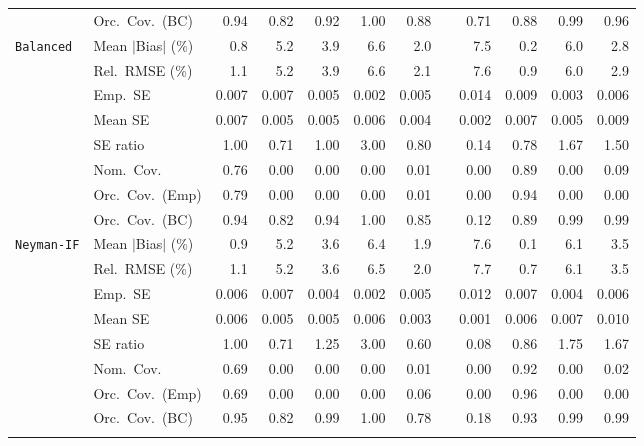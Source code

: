 \begin{landscape}
\begin{longtable}{llrrrrrrrrrr}
 & Orc.\ Cov.\ (BC) & \cellcolor{rankone}0.94 & 0.82 & \cellcolor{ranktwo}0.92 & 1.00 & 0.88 &  & 0.71 & 0.88 & \cellcolor{rankthree}0.99 & \cellcolor{rankone}0.96 \\
\addlinespace[2pt]
\quad \texttt{Balanced} & Mean $|$Bias$|$ (\%) & \cellcolor{ranktwo}0.8 & 5.2 & 3.9 & 6.6 & \cellcolor{rankthree}2.0 &  & 7.5 & \cellcolor{rankone}0.2 & 6.0 & 2.8 \\
 & Rel.\ RMSE (\%) & \cellcolor{ranktwo}1.1 & 5.2 & 3.9 & 6.6 & \cellcolor{rankthree}2.1 &  & 7.6 & \cellcolor{rankone}0.9 & 6.0 & 2.9 \\
 & Emp.\ SE & 0.007 & 0.007 & 0.005 & 0.002 & 0.005 &  & 0.014 & 0.009 & 0.003 & 0.006 \\
 & Mean SE & 0.007 & 0.005 & 0.005 & 0.006 & 0.004 &  & 0.002 & 0.007 & 0.005 & 0.009 \\
 & SE ratio & \cellcolor{rankone}1.00 & 0.71 & \cellcolor{rankone}1.00 & 3.00 & \cellcolor{ranktwo}0.80 &  & 0.14 & \cellcolor{rankthree}0.78 & 1.67 & 1.50 \\
 & Nom.\ Cov. & \cellcolor{ranktwo}0.76 & 0.00 & 0.00 & 0.00 & 0.01 &  & 0.00 & \cellcolor{rankone}0.89 & 0.00 & \cellcolor{rankthree}0.09 \\
 & Orc.\ Cov.\ (Emp) & \cellcolor{ranktwo}0.79 & 0.00 & 0.00 & 0.00 & \cellcolor{rankthree}0.01 &  & 0.00 & \cellcolor{rankone}0.94 & 0.00 & 0.00 \\
 & Orc.\ Cov.\ (BC) & \cellcolor{rankone}0.94 & 0.82 & \cellcolor{rankone}0.94 & \cellcolor{rankthree}1.00 & 0.85 &  & 0.12 & 0.89 & \cellcolor{ranktwo}0.99 & \cellcolor{ranktwo}0.99 \\
\addlinespace[2pt]
\quad \texttt{Neyman-IF} & Mean $|$Bias$|$ (\%) & \cellcolor{ranktwo}0.9 & 5.2 & 3.6 & 6.4 & \cellcolor{rankthree}1.9 &  & 7.6 & \cellcolor{rankone}0.1 & 6.1 & 3.5 \\
 & Rel.\ RMSE (\%) & \cellcolor{ranktwo}1.1 & 5.2 & 3.6 & 6.5 & \cellcolor{rankthree}2.0 &  & 7.7 & \cellcolor{rankone}0.7 & 6.1 & 3.5 \\
 & Emp.\ SE & 0.006 & 0.007 & 0.004 & 0.002 & 0.005 &  & 0.012 & 0.007 & 0.004 & 0.006 \\
 & Mean SE & 0.006 & 0.005 & 0.005 & 0.006 & 0.003 &  & 0.001 & 0.006 & 0.007 & 0.010 \\
 & SE ratio & \cellcolor{rankone}1.00 & 0.71 & \cellcolor{rankthree}1.25 & 3.00 & 0.60 &  & 0.08 & \cellcolor{ranktwo}0.86 & 1.75 & 1.67 \\
 & Nom.\ Cov. & \cellcolor{ranktwo}0.69 & 0.00 & 0.00 & 0.00 & 0.01 &  & 0.00 & \cellcolor{rankone}0.92 & 0.00 & \cellcolor{rankthree}0.02 \\
 & Orc.\ Cov.\ (Emp) & \cellcolor{ranktwo}0.69 & 0.00 & 0.00 & 0.00 & \cellcolor{rankthree}0.06 &  & 0.00 & \cellcolor{rankone}0.96 & 0.00 & 0.00 \\
 & Orc.\ Cov.\ (BC) & \cellcolor{rankone}0.95 & 0.82 & \cellcolor{rankthree}0.99 & 1.00 & 0.78 &  & 0.18 & \cellcolor{ranktwo}0.93 & \cellcolor{rankthree}0.99 & \cellcolor{rankthree}0.99 \\
\addlinespace[2pt]
\end{longtable}
\end{landscape}

